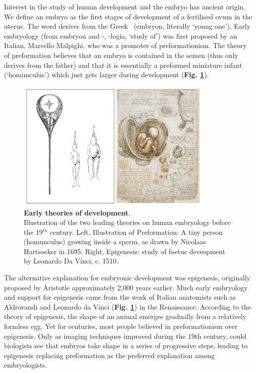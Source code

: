 Interest in the study of human development and the embryo has ancient origin.
We define an embryo as the first stages of development of a fertilised ovum in the uterus.
The word derives from the Greek \textepsilon\textmu\textbeta\textrho\textupsilon\textomikron\textnu \ (embryon, literally `young one').
Early embryology (from embryon and -\textlambda\textomikron\textgamma\textiota\textalpha, -logia, `study of') was first proposed by an Italian, Marcello Malpighi, who was a promoter of preformationism.
The theory of preformation believes that an embryo is contained in the semen (thus only derives from the father) and that it is essentially a preformed miniature infant (`homunculus') which just gets larger during development (\textbf{Fig. \ref{fig:early_embryology}}).\\

\begin{figure}
\includegraphics[width=9.5cm]{Chapter1/Fig/Early_theories_development.png}
\caption[Early theories of development]{\textbf{Early theories of development}.\\
Illustration of the two leading theories on human embryology before the 19$^{th}$ century.
Left, Illustration of Preformation: 
A tiny person (homunculus) growing inside a sperm, as drawn by Nicolaas Hartsoeker in 1695.
Right, Epigenesis: study of foetus deveopment by Leonardo Da Vinci, c. 1510.}
\label{fig:early_embryology}
\end{figure}

The alternative explanation for embryonic development was epigenesis, originally proposed by Aristotle approximately 2,000 years earlier. 
Much early embryology and support for epigenesis came from the work of Italian anatomists such as Aldrovandi and Leonardo da Vinci (\textbf{Fig. \ref{fig:early_embryology}}) in the Renaissance.
According to the theory of epigenesis, the shape of an animal emerges gradually from a relatively formless egg. 
Yet for centuries, most people believed in preformationism over epigenesis.
Only as imaging techniques improved during the 19th century, could biologists see that embryos take shape in a series of progressive steps, leading to epigenesis replacing preformation as the preferred explanation among embryologists.\\


